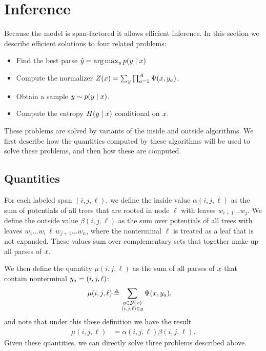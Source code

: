\section{Inference}
Because the model is span-factored it allows efficient inference. In this section we describe efficient solutions to four related problems:
\begin{itemize}
  \item Find the best parse $\hat{ y } = \arg \max_{y } p(y  \mid x)$
  \item Compute the normalizer $Z(x) = \sum_{ y  } \prod_{ a=1 }^{ A } \Psi( x, y_a )$.
  \item Obtain a sample $y \sim p(y  \mid x)$.
  \item Compute the entropy $H(y \mid x)$ conditional on $x$.
\end{itemize}
These problems are solved by variants of the inside and outside algorithms. We first describe how the quantities computed by these algorithms will be used to solve these problems, and then how these are computed.

\subsection{Quantities}
For each labeled span $(i, j, \ell)$, we define the inside value $\alpha(i, j, \ell)$ as the sum of potentials of all trees that are rooted in node $\ell$ with leaves $w_{i+1} \dots w_j$. We define the outside value $\beta(i, j, \ell)$ as the sum over potentials of all trees with leaves $w_1 \dots w_i \,\ell\, w_{j+1} \dots w_n$, where the nonterminal $\ell$ is treated as a leaf that is not expanded. These values sum over complementary sets that together make up all parses of $x$.


We then define the quantity $\mu(i, j, \ell)$ as the sum of all parses of $x$ that contain nonterminal $y_a = (i, j, \ell)$:
\begin{align*}
  \mu(i, j, \ell)
    &\triangleq \sum_{ \substack{ y \in \mathcal{Y}(x) \\ (i, j, \ell) \in y } } \Psi(x, y_a),
\end{align*}
and note that under this these definition we have the result
\begin{align*}
  \mu(i, j, \ell) &= \alpha(i, j, \ell) \beta(i, j, \ell).
\end{align*}
Given these quantities, we can directly solve three problems described above.

